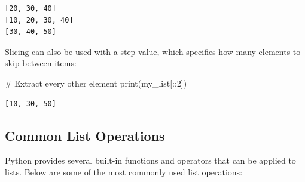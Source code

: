 \documentclass[
  letterpaper,
  DIV=11,
  numbers=noendperiod]{scrreprt}
\newenvironment{Shaded}{\begin{snugshade}}{\end{snugshade}}
\newcommand{\BuiltInTok}[1]{\textcolor[rgb]{0.00,0.23,0.31}{#1}}
\newcommand{\CommentTok}[1]{\textcolor[rgb]{0.37,0.37,0.37}{#1}}
\newcommand{\DecValTok}[1]{\textcolor[rgb]{0.68,0.00,0.00}{#1}}
\newcommand{\NormalTok}[1]{\textcolor[rgb]{0.00,0.23,0.31}{#1}}
\begin{document}
\begin{verbatim}
[20, 30, 40]
[10, 20, 30, 40]
[30, 40, 50]
\end{verbatim}

Slicing can also be used with a step value, which specifies how many
elements to skip between items:

\begin{Shaded}
\begin{Highlighting}[]
\CommentTok{\# Extract every other element}
\BuiltInTok{print}\NormalTok{(my\_list[::}\DecValTok{2}\NormalTok{]) }
\end{Highlighting}
\end{Shaded}

\begin{verbatim}
[10, 30, 50]
\end{verbatim}

\hypertarget{common-list-operations}{%
\subsection{Common List Operations}\label{common-list-operations}}

Python provides several built-in functions and operators that can be
applied to lists. Below are some of the most commonly used list
operations:
\end{document}
